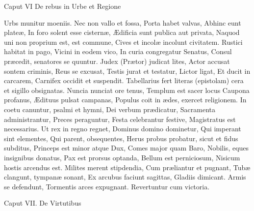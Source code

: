 \documentclass{book}
\begin{document}
Caput VI
De rebus in Urbe et Regione

Urbs munitur moeniis.
Nec non vallo et fossa,
Porta habet valvas,
Abhinc eunt plateæ,
In foro solent esse cisternæ,
Ædificia sunt publica aut privata,
Naquod uni non proprium est, est commune,
Cives et incolæ incolunt civitatem.
Rustici habitat in pago,
Vicini in eodem vico,
In curia congregatur Senatus,
Consul præcedit, senatores se quuntur.
Judex (Prætor) judicat lites,
Actor accusat sontem criminis,
Reus se excusat,
Testis jurat et testatur,
Lictor ligat,
Et ducit in carcarem,
Carnifex occidit et suspendit.
Tabellarius fert literas (epistolam) cera et sigillo obsignatas.
Nuncia nunciat ore tenus,
Templum est sacer locus
Caupona profanus,
Ædituus pulsat campanas,
Populus coit in ædes, exercet religionem.
In coetu canuntur, psalmi et hymni,
Dei verbum prædicatur,
Sacramenta administrantur,
Preces peraguntur,
Festa celebrantur festive,
Magistratus est necessarius.
Ut rex in regno regnet,
Dominus domino dominetur,
Qui imperant sint elementes,
Qui parent, obsequentes,
Herus probus probatur, sicut et fidus subditus,
Princeps est minor atque Dux,
Comes major quam Baro,
Nobilis, eques insignibus donatus,
Pax est prorsus optanda,
Bellum est perniciosum,
Nisicum hostis arcendus est.
Milites merent stipdendia,
Cum præliantur et pugnant,
Tubæ clangunt, tympanæ sonant,
Ex arcubus faciunt sagittas,
Gladiis dimicant.
Armis se defendunt,
Tormentis arces expugnant.
Revertuntur cum victoria.

Caput VII.
De Virtutibus
\end{document}
